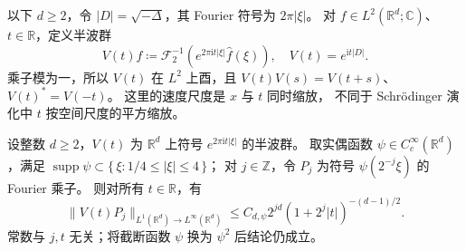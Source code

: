 \ProseParagraphBreak
以下 \(d\ge2\)，令 \(|D|=\sqrt{-\Delta}\)，其 Fourier 符号为 \(2\pi|\xi|\)。
对 \(f\in L^2(\mathbb R^d;\mathbb C)\)、\(t\in\mathbb R\)，定义半波群
\[
 V(t)f\coloneqq
 \mathcal F_2^{-1}\left(e^{2\pi\mathrm it|\xi|}\widehat f(\xi)\right),
 \quad V(t)=e^{\mathrm it|D|}.
\]
乘子模为一，所以 \(V(t)\) 在 \(L^2\) 上酉，且
\(V(t)V(s)=V(t+s)\)、\(V(t)^*=V(-t)\)。
这里的速度尺度是 \(x\) 与 \(t\) 同时缩放，
不同于 Schrödinger 演化中 \(t\) 按空间尺度的平方缩放。

\begin{lemma}[环带半波核]\label{b2:lem:E-half-wave-kernel}
设整数 \(d\ge2\)，\(V(t)\) 为 \(\mathbb R^d\) 上符号
\(e^{2\pi\mathrm it|\xi|}\) 的半波群。
取实偶函数 \(\psi\in C_c^\infty(\mathbb R^d)\)，满足
\(\operatorname{supp}\psi\subset\{\,\xi:1/4\le|\xi|\le4\,\}\)；
对 \(j\in\mathbb Z\)，令 \(P_j\) 为符号 \(\psi(2^{-j}\xi)\) 的 Fourier 乘子。
则对所有 \(t\in\mathbb R\)，有
\[
 \|V(t)P_j\|_{L^1(\mathbb R^d)\to L^\infty(\mathbb R^d)}
 \le C_{d,\psi}2^{jd}(1+2^j|t|)^{-(d-1)/2}.
\]
常数与 \(j,t\) 无关；将截断函数 \(\psi\) 换为 \(\psi^2\) 后结论仍成立。
\end{lemma}
